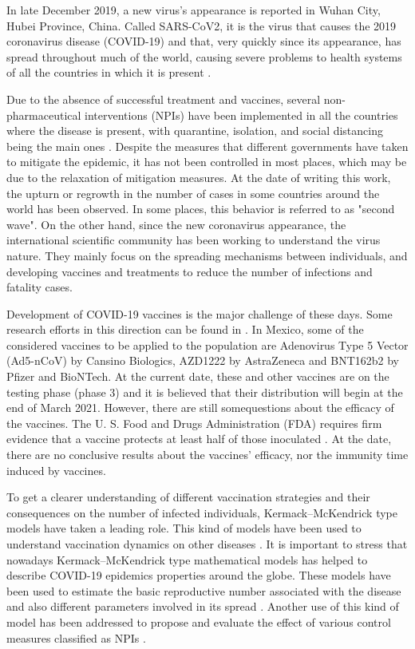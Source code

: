     In late December 2019, a new virus's appearance is reported in Wuhan City,
Hubei Province, China. Called SARS-CoV2, it is the virus that causes the 2019
coronavirus disease (COVID-19) and that, very quickly since its appearance, has
spread throughout much of the world, causing severe problems to health systems
of all the countries in which it is present \cite{Who12020}.

    Due to the absence of successful treatment and vaccines, several
non-pharmaceutical interventions (NPIs) have been implemented in all the
countries where the disease is present, with quarantine, isolation, and social
distancing being the main ones \cite{Wilder2020,Liu2020_2}. Despite the measures
that different governments have taken to mitigate the epidemic, it has not been
controlled in most places, which may be due to the relaxation of mitigation
measures. At the date of writing this work, the upturn or regrowth in the number
of cases in some countries around the world has been observed. In some places,
this behavior is referred to as "second wave". On the other hand, since the new
coronavirus appearance, the international scientific community has been working
to understand the virus nature. They mainly focus on the spreading mechanisms
between individuals, and developing vaccines and treatments to reduce the number
of infections and fatality cases.

    Development of COVID-19 vaccines is the major challenge of these days. Some
research efforts in this direction can be found in \cite{Belete2020,Kaur2020}.
In Mexico, some of the considered vaccines to be applied to the population are
Adenovirus Type 5 Vector (Ad5-nCoV) by Cansino Biologics, AZD1222 by
AstraZeneca and BNT162b2 by Pfizer and BioNTech. At the current date, these
and other vaccines are on the testing phase (phase 3) and it is believed that
their distribution will begin at the end of March 2021. However, there are
still somequestions about the efficacy of the vaccines. The U. S. Food and Drugs
Administration (FDA) requires firm evidence that a vaccine protects at least
half of those inoculated \cite{Shah2020}. At the date, there are no conclusive
results about the vaccines' efficacy, nor the immunity time induced by vaccines.

    To get a clearer understanding of different vaccination strategies and their
consequences on the number of infected individuals, Kermack--McKendrick type
models have taken a leading role. This kind of models have been used to
understand vaccination dynamics on other diseases \cite{Alexander2004}. It is
important to stress that nowadays Kermack--McKendrick type mathematical models
has helped to describe COVID-19 epidemics properties around the globe. These
models have been used to estimate the basic reproductive number associated with
the disease and also different parameters involved in its spread
\cite{Liu2020,Sarkar2020}. Another use of this kind of model has been addressed
to propose and evaluate the effect of various control measures classified as
NPIs
\cite{Acuna2020,Santana2020,Ngonghala2020,Liu2020,Shaikh2020,DeVisscher2020}.

